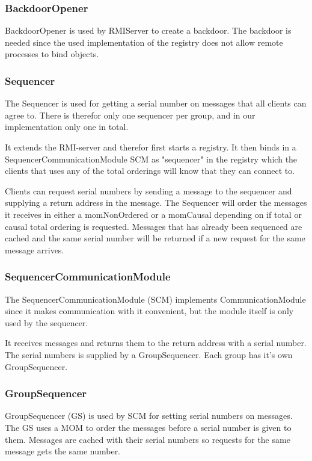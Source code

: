 \documentclass[english]{article}
\begin{document}
\subsubsection{BackdoorOpener}
BackdoorOpener is used by RMIServer to create a backdoor. The backdoor is needed since the used implementation of the registry does not allow remote processes to bind objects.

\subsubsection{Sequencer}
The Sequencer is used for getting a serial number on messages that all clients can agree to. There is therefor only one sequencer per group, and in our implementation only one in total.

It extends the RMI-server and therefor first starts a registry. It then binds in a SequencerCommunicationModule SCM as "sequencer" in the registry which the clients that uses any of the total orderings will know that they can connect to. 

Clients can request serial numbers by sending a message to the sequencer and supplying a return address in the message. The Sequencer will order the messages it receives in either a momNonOrdered or a momCausal depending on if total or causal total ordering is requested. Messages that has already been sequenced are cached and the same serial number will be returned if a new request for the same message arrives.

\subsubsection{SequencerCommunicationModule}
The SequencerCommunicationModule (SCM) implements CommunicationModule since it makes communication with it convenient, but the module itself is only used by the sequencer. 

It receives messages and returns them to the return address with a serial number. The serial numbers is supplied by a GroupSequencer. Each group has it's own GroupSequencer.

\subsubsection{GroupSequencer}
GroupSequencer (GS) is used by SCM for setting serial numbers on messages. The GS uses a MOM to order the messages before a serial number is given to them. Messages are cached with their serial numbers so requests for the same message gets the same number. 
\end{document}
